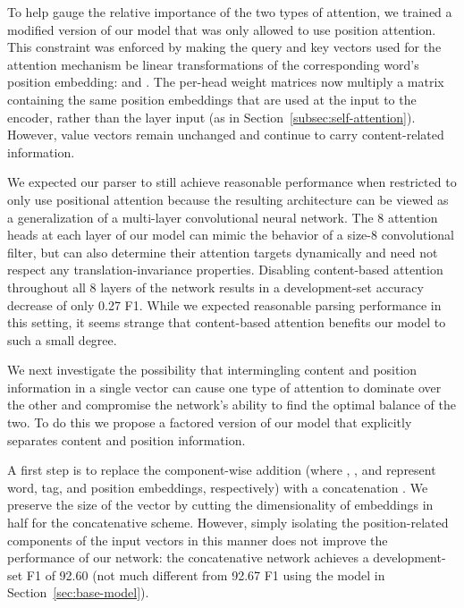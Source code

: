 \documentclass[11pt,a4paper]{article}
\begin{document}
To help gauge the relative importance of the two types of attention, we trained a modified version of our model that was only allowed to use position attention. This constraint was enforced by making the query and key vectors used for the attention mechanism be linear transformations of the corresponding word's position embedding:  and . The per-head weight matrices now multiply a matrix  containing the same position embeddings that are used at the input to the encoder, rather than the layer input  (as in Section~\ref{subsec:self-attention}). However, value vectors  remain unchanged and continue to carry content-related information.

We expected our parser to still achieve reasonable performance when restricted to only use positional attention because the resulting architecture can be viewed as a generalization of a multi-layer convolutional neural network. The 8 attention heads at each layer of our model can mimic the behavior of a size-8 convolutional filter, but can also determine their attention targets dynamically and need not respect any translation-invariance properties. Disabling content-based attention throughout all 8 layers of the network results in a development-set accuracy decrease of only 0.27 F1. While we expected reasonable parsing performance in this setting, it seems strange that content-based attention benefits our model to such a small degree.

We next investigate the possibility that intermingling content and position information in a single vector can cause one type of attention to dominate over the other and compromise the network's ability to find the optimal balance of the two. To do this we propose a factored version of our model that explicitly separates content and position information.

A first step is to replace the component-wise addition  (where , , and  represent word, tag, and position embeddings, respectively) with a concatenation . We preserve the size of the vector  by cutting the dimensionality of embeddings in half for the concatenative scheme. However, simply isolating the position-related components of the input vectors in this manner does not improve the performance of our network: the concatenative network achieves a development-set F1 of 92.60 (not much different from 92.67 F1 using the model in Section~\ref{sec:base-model}).
\end{document}

